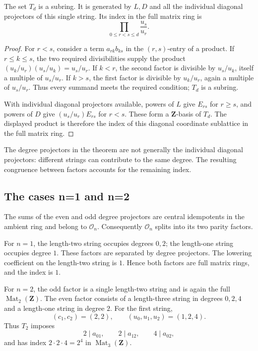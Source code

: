 \begin{lemma}
\label{sl:triangular-order}
The set \(T_d\) is a subring.  It is generated by \(L,D\) and all
the individual diagonal projectors of this single string.  Its
index in the full matrix ring is
\[
\prod_{0\le r<s\le d}\frac{u_s}{u_r}.
\]
\end{lemma}

\begin{proof}
For \(r<s\), consider a term \(a_{rk}b_{ks}\) in the
\((r,s)\)-entry of a product.  If \(r\le k\le s\), the two required
divisibilities supply the product
\((u_k/u_r)(u_s/u_k)=u_s/u_r\).  If \(k<r\), the second factor is
divisible by \(u_s/u_k\), itself a multiple of \(u_s/u_r\).
If \(k>s\), the first factor is divisible by \(u_k/u_r\), again
a multiple of \(u_s/u_r\).  Thus every summand meets the required
condition; \(T_d\) is a subring.

With individual diagonal projectors available, powers of \(L\)
give \(E_{rs}\) for \(r\ge s\), and powers of \(D\) give
\((u_s/u_r)E_{rs}\) for \(r<s\).  These form a
\(\mathbf Z\)-basis of \(T_d\).  The displayed product is therefore
the index of this diagonal coordinate sublattice in the full
matrix ring.
\end{proof}

The degree projectors in the theorem are not generally the
individual diagonal projectors: different strings can contribute
to the same degree.  The resulting congruence between factors
accounts for the remaining index.

\subsection{The cases n=1 and n=2}

The sums of the even and odd degree projectors are central
idempotents in the ambient ring and belong to \(\mathcal O_n\).
Consequently \(\mathcal O_n\) splits into its two parity factors.

For \(n=1\), the length-two string occupies degrees \(0,2\);
the length-one string occupies degree \(1\).  These factors are
separated by degree projectors.  The lowering coefficient on
the length-two string is \(1\).  Hence both factors are full
matrix rings, and the index is \(1\).

For \(n=2\), the odd factor is a single length-two string and
is again the full \(\operatorname{Mat}_2(\mathbf Z)\).
The even factor consists of a length-three string in degrees
\(0,2,4\) and a length-one string in degree \(2\).
For the first string,
\[
(c_1,c_2)=(2,2),\qquad (u_0,u_1,u_2)=(1,2,4).
\]
Thus \(T_2\) imposes
\[
2\mid a_{01},\qquad 2\mid a_{12},\qquad 4\mid a_{02},
\]
and has index \(2\cdot2\cdot4=2^4\) in
\(\operatorname{Mat}_3(\mathbf Z)\).

